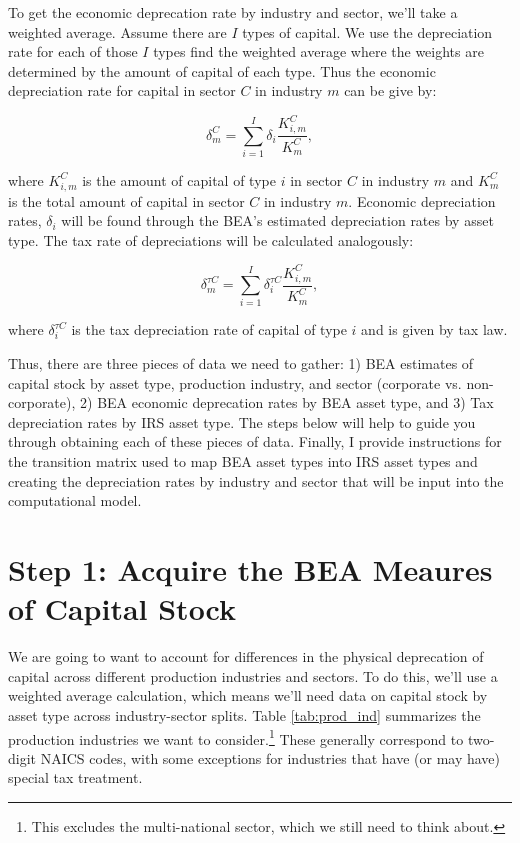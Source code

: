 \documentclass[article,11pt,letterpaper,fleqn]{article}
\theoremstyle{definition}
\numberwithin{equation}{section}
\begin{document}
To get the economic deprecation rate by industry and sector, we'll take a weighted average.  Assume there are $I$ types of capital.  We use the depreciation rate for each of those $I$ types find the weighted average where the weights are determined by the amount of capital of each type.  Thus the economic depreciation rate for capital in sector $C$ in industry $m$ can be give by:

\begin{equation}
\label{eqn:econ_deprec}
\delta^{C}_{m}=\sum_{i=1}^{I}\delta_{i}\frac{K^{C}_{i,m}}{K^{C}_{m}},
\end{equation}

\noindent\noindent where $K^{C}_{i,m}$ is the amount of capital of type $i$ in sector $C$ in industry $m$ and $K^{C}_{m}$ is the total amount of capital in sector $C$ in industry $m$.  Economic depreciation rates, $\delta_{i}$ will be found through the BEA's estimated depreciation rates by asset type.  The tax rate of depreciations will be calculated analogously: 

\begin{equation}
\label{eqn:tax_deprec}
\delta^{\tau C}_{m}=\sum_{i=1}^{I}\delta^{\tau C}_{i}\frac{K^{C}_{i,m}}{K^{C}_{m}},
\end{equation}

\noindent\noindent where $\delta^{\tau C}_{i}$ is the tax depreciation rate  of capital of type $i$ and is given by tax law.

Thus, there are three pieces of data we need to gather: 1) BEA estimates of capital stock by asset type, production industry, and sector (corporate vs. non-corporate), 2) BEA economic deprecation rates by BEA asset type,  and 3) Tax depreciation rates by IRS asset type.  The steps below will help to guide you through obtaining each of these pieces of data.  Finally, I provide instructions for the transition matrix used to map BEA asset types into IRS asset types and creating the depreciation rates by industry and sector that will be input into the computational  model.

\section*{Step 1: Acquire the BEA Meaures of Capital Stock}
\label{sec:step3}

We are going to want to account for differences in the physical deprecation of capital across different production industries and sectors.  To do this, we'll use a weighted average calculation, which means we'll need data on capital stock by asset type across industry-sector splits.  Table \ref{tab:prod_ind} summarizes the production industries we want to consider.\footnote{This excludes the multi-national sector, which we still need to think about.}  These generally correspond to two-digit NAICS codes, with some exceptions for industries that have (or may have) special tax treatment.
\end{document}
